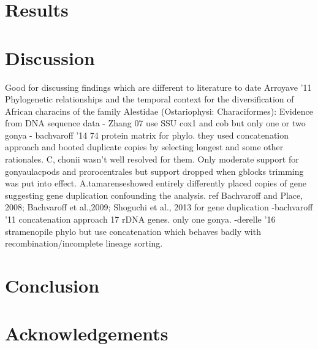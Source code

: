 \documentclass[12pt]{article}
\begin{document}
\newpage
\section{Results}


\newpage
\section{Discussion}
Good for discussing findings which are different to literature to date Arroyave '11 Phylogenetic relationships and the temporal context for the diversification
of African characins of the family Alestidae (Ostariophysi: Characiformes): Evidence from DNA sequence data
- Zhang 07 use SSU cox1 and cob but only one or two gonya
- bachvaroff '14 74 protein matrix for phylo. they used concatenation approach and booted duplicate copies by selecting longest and some other rationales. C, chonii wasn't well resolved for them. Only moderate support for gonyaulacpods and prorocentrales but support dropped when gblocks trimming was put into effect. A.tamarenseshowed entirely differently placed copies of gene suggesting gene duplication confounding the analysis.  ref Bachvaroff and Place, 2008; Bachvaroff et al.,2009; Shoguchi et al., 2013 for gene duplication
-bachvaroff '11 concatenation approach 17 rDNA genes. only one gonya.
-derelle '16 stramenopile phylo but use concatenation which behaves badly with recombination/incomplete lineage sorting.




\newpage
\section{Conclusion}
\newpage

\section{Acknowledgements}


\end{document}
